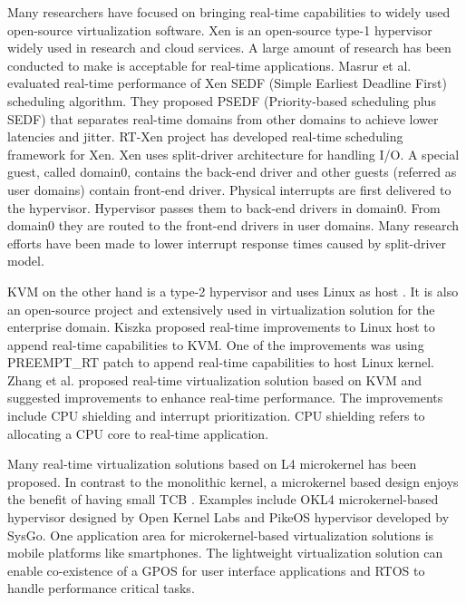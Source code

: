 Many researchers have focused on bringing real-time capabilities to widely used open-source virtualization software.
Xen \cite{Barham:2003:XAV:1165389.945462} is an open-source type-1 hypervisor widely used in research and cloud services.
A large amount of research has been conducted to make is acceptable for real-time applications.
Masrur et al. \cite{masrur2010vm} evaluated real-time performance of Xen SEDF (Simple Earliest Deadline First)
scheduling algorithm. They proposed PSEDF (Priority-based scheduling plus SEDF) that separates
real-time domains from other domains to achieve lower latencies and jitter.
RT-Xen project \cite{Xi:2011:RTR:2038642.2038651} has developed real-time scheduling framework for Xen.
Xen uses split-driver architecture for handling I/O. A special guest, called domain0, contains the
back-end driver and other guests (referred as user domains) contain front-end driver.
Physical interrupts are first delivered to the hypervisor. Hypervisor passes them to back-end drivers in domain0.
From domain0 they are routed to the front-end drivers in user domains.
Many research efforts have been made to lower interrupt response times caused by split-driver model.

KVM on the other hand is a type-2 hypervisor and uses Linux as host \cite{kivity2007kvm}. 
It is also an open-source project and extensively used in virtualization solution for the enterprise domain.
Kiszka \cite{kiszka2009towards} proposed real-time improvements to Linux host to append real-time capabilities to KVM.
One of the improvements was using PREEMPT\_RT patch to append real-time capabilities to host Linux kernel.
Zhang et al. \cite{zuo2010performance} proposed real-time virtualization solution based on KVM and suggested improvements to 
enhance real-time performance. The improvements include CPU shielding and interrupt prioritization. CPU shielding
refers to allocating a CPU core to real-time application. 

Many real-time virtualization solutions based on L4 microkernel has been proposed. 
In contrast to the monolithic kernel, a microkernel based design enjoys the benefit of having small TCB \cite{Heiser:2008:RVE:1435458.1435461}.
Examples include OKL4 microkernel-based hypervisor designed by Open Kernel Labs and PikeOS hypervisor developed by SysGo.
One application area for microkernel-based virtualization solutions is mobile platforms like smartphones.
The lightweight virtualization solution can enable co-existence of a GPOS for user interface applications and
RTOS to handle performance critical tasks.

